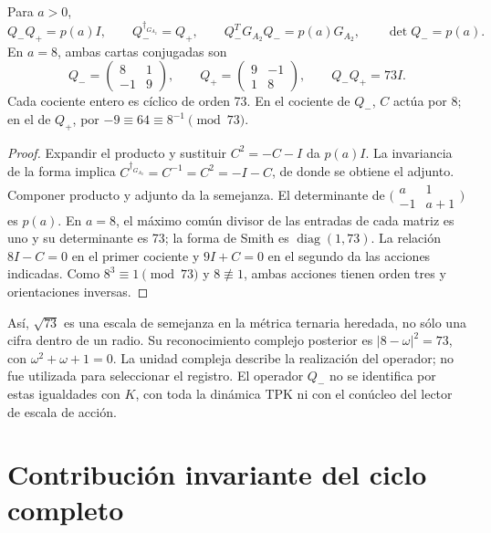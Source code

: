 \begin{proposition}
\label{x_reciprocidad:lib02:norma-A2}
Para \(a>0\),
\[
 Q_-Q_+=p(a)I,\qquad Q_-^{\dagger_{G_{A_2}}}=Q_+,
 \qquad Q_-^TG_{A_2}Q_-=p(a)G_{A_2},\qquad \det Q_-=p(a).
\]
En \(a=8\), ambas cartas conjugadas son
\[
 Q_-=
 \begin{pmatrix}8&1\\-1&9\end{pmatrix},\qquad
 Q_+=\begin{pmatrix}9&-1\\1&8\end{pmatrix},\qquad Q_-Q_+=73I.
\]
Cada cociente entero es cíclico de orden 73. En el cociente de \(Q_-\),
\(C\) actúa por \(8\); en el de \(Q_+\), por
\(-9\equiv64\equiv8^{-1}\pmod{73}\).
\end{proposition}
\begin{proof}
Expandir el producto y sustituir \(C^2=-C-I\) da \(p(a)I\).
La invariancia de la forma implica
\(C^{\dagger_{G_{A_2}}}=C^{-1}=C^2=-I-C\), de donde se obtiene
el adjunto. Componer producto y adjunto da la semejanza. El determinante
de \(\bigl(\begin{smallmatrix}a&1\\-1&a+1\end{smallmatrix}\bigr)\)
es \(p(a)\). En \(a=8\), el máximo común divisor de las entradas
de cada matriz es uno y su determinante es 73; la forma de Smith es
\(\operatorname{diag}(1,73)\). La relación \(8I-C=0\) en el
primer cociente y \(9I+C=0\) en el segundo da las acciones indicadas.
Como \(8^3\equiv1\pmod{73}\) y \(8\not\equiv1\), ambas
acciones tienen orden tres y orientaciones inversas.
\end{proof}

Así, \(\sqrt{73}\) es una escala de semejanza en la métrica ternaria
heredada, no sólo una cifra dentro de un radio. Su reconocimiento complejo
posterior es \(|8-\omega|^2=73\), con
\(\omega^2+\omega+1=0\). La unidad compleja describe la realización
del operador; no fue utilizada para seleccionar el registro. El operador
\(Q_-\) no se identifica por estas igualdades con \(K\), con toda
la dinámica TPK ni con el conúcleo del lector de escala de acción.

\section{Contribución invariante del ciclo completo}
\label{x_reciprocidad:lib02:ciclo-completo}

